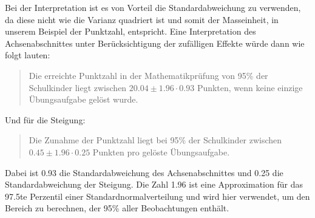 \documentclass[12pt]{article}\usepackage[]{graphicx}\usepackage[]{color}
\begin{document}
Bei der Interpretation ist es von Vorteil die Standardabweichung zu verwenden, da diese nicht wie die Varianz quadriert ist und somit der Masseinheit, in unserem Beispiel der Punktzahl, entspricht. Eine Interpretation des Achsenabschnittes unter Berücksichtigung der zufälligen Effekte würde dann wie folgt lauten: 
\begin{quote}
Die erreichte Punktzahl in der Mathematikprüfung von 95\% der Schulkinder liegt zwischen  $20.04 \pm 1.96 \cdot 0.93$ Punkten, wenn keine einzige Übungsaufgabe gelöst wurde.
\end{quote}
Und für die Steigung:
\begin{quote}
Die Zunahme der Punktzahl liegt bei 95\% der Schulkinder zwischen $0.45 \pm 1.96 \cdot 0.25$ Punkten pro gelöste Übungsaufgabe.
\end{quote}
Dabei ist 0.93 die Standardabweichung des Achsenabschnittes und 0.25 die Standardabweichung der Steigung. Die Zahl 1.96 ist eine Approximation für das 97.5te Perzentil einer Standardnormalverteilung und wird hier verwendet, um den Bereich zu berechnen, der 95\% aller Beobachtungen enthält. 
\end{document}
